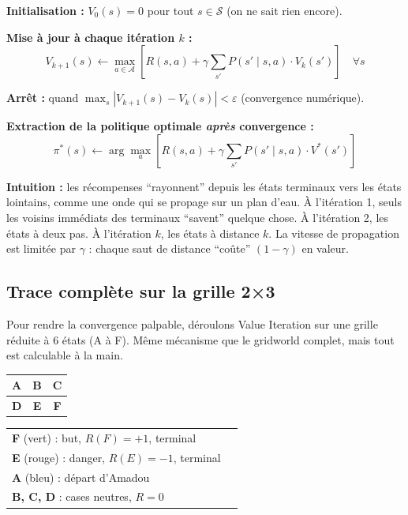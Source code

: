 \documentclass[11pt,a4paper]{article}
\begin{document}
\begin{recipebox}
\textbf{Initialisation :} $V_0(s) = 0$ pour tout $s \in \mathcal{S}$ \quad (on ne sait rien encore).

\textbf{Mise à jour à chaque itération $k$ :}
$$V_{k+1}(s) \leftarrow \max_{a \in \mathcal{A}} \left[ R(s,a) + \gamma \sum_{s'} P(s' \mid s,a) \cdot V_k(s') \right] \quad \forall s$$

\textbf{Arrêt :} quand $\max_s |V_{k+1}(s) - V_k(s)| < \varepsilon$ \quad (convergence numérique).

\textbf{Extraction de la politique optimale \textit{après} convergence :}
$$\pi^*(s) \leftarrow \arg\max_{a} \left[ R(s,a) + \gamma \sum_{s'} P(s' \mid s,a) \cdot V^*(s') \right]$$

\textbf{Intuition :} les récompenses ``rayonnent'' depuis les états terminaux vers les états lointains, comme une onde qui se propage sur un plan d'eau. À l'itération 1, seuls les voisins immédiats des terminaux ``savent'' quelque chose. À l'itération 2, les états à deux pas. À l'itération $k$, les états à distance $k$. La vitesse de propagation est limitée par $\gamma$ : chaque saut de distance ``coûte'' $(1-\gamma)$ en valeur.
\end{recipebox}

\subsection{Trace complète sur la grille 2×3}

Pour rendre la convergence palpable, déroulons Value Iteration sur une grille réduite à 6 états (A à F). Même mécanisme que le gridworld complet, mais tout est calculable à la main.

\begin{center}
\begin{tabular}{|c|c|c|}
\hline
\cellcolor{blue!15} \textbf{A} & \textbf{B} & \textbf{C} \\
\hline
\textbf{D} & \cellcolor{red!20} \textbf{E} & \cellcolor{green!20} \textbf{F} \\
\hline
\end{tabular}
\qquad
\begin{tabular}{ll}
\textbf{F} (vert) : but, $R(F)=+1$, terminal \\
\textbf{E} (rouge) : danger, $R(E)=-1$, terminal \\
\textbf{A} (bleu) : départ d'Amadou \\
\textbf{B, C, D} : cases neutres, $R=0$ \\
\end{tabular}
\end{center}
\end{document}
